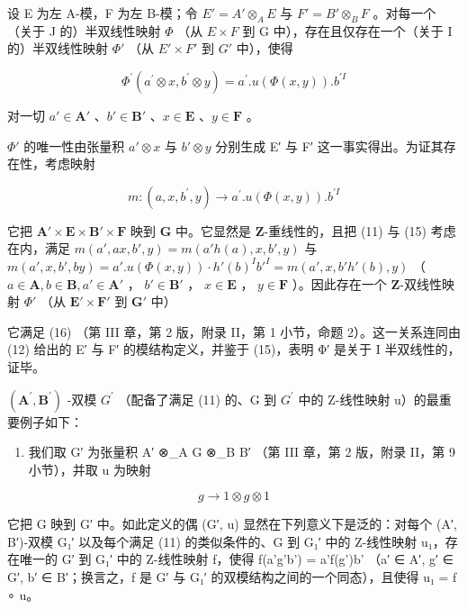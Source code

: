 设 E 为左 A-模，F 为左 B-模；令 \(E' = A' \otimes_{A} E\) 与 \(F' = B' \otimes_{B} F\) 。对每一个（关于 J 的）半双线性映射 \(\Phi\) （从 \(E \times F\) 到 G 中），存在且仅存在一个（关于 I 的）半双线性映射 \(\Phi'\) （从 \(E' \times F'\) 到 \(G'\) 中），使得

\[
\Phi^ {\prime} (a ^ {\prime} \otimes x, b ^ {\prime} \otimes y) = a ^ {\prime}. u (\Phi (x, y)). b ^ {\prime I}\tag{16}
\]

对一切 \(a' \in \mathbf{A}'\) 、\(b' \in \mathbf{B}'\) 、\(x \in \mathbf{E}\) 、\(y \in \mathbf{F}\) 。

\(\Phi'\) 的唯一性由张量积 \(a' \otimes x\) 与 \(b' \otimes y\) 分别生成 E′ 与 F′ 这一事实得出。为证其存在性，考虑映射

\[
m: (a, x, b ^ {\prime}, y) \rightarrow a ^ {\prime}. u (\Phi (x, y)). b ^ {\prime I}
\]

它把 \(\mathbf{A}' \times \mathbf{E} \times \mathbf{B}' \times \mathbf{F}\) 映到 \(\mathbf{G}\) 中。它显然是 \(\mathbf{Z}\)-重线性的，且把 (11) 与 (15) 考虑在内，满足 \(m(a', ax, b', y) = m(a'h(a), x, b', y)\) 与 \(m(a', x, b', by) = a'. u(\Phi(x, y)) \cdot h'(b)^{I} b'^{I} = m(a', x, b'h'(b), y)\) （ \(a \in \mathbf{A}, b \in \mathbf{B}, a' \in \mathbf{A}'\) ， \(b' \in \mathbf{B}'\) ， \(x \in \mathbf{E}\) ， \(y \in \mathbf{F}\) ）。因此存在一个 \(\mathbf{Z}\)-双线性映射 \(\Phi'\) （从 \(\mathbf{E}' \times \mathbf{F}'\) 到 \(\mathbf{G}'\) 中）

它满足 (16) （第 III 章，第 2 版，附录 II，第 1 小节，命题 2）。这一关系连同由 (12) 给出的 E′ 与 F′ 的模结构定义，并鉴于 (15)，表明 Φ′ 是关于 I 半双线性的，证毕。

\((\mathbf{A}^{\prime}, \mathbf{B}^{\prime})\) -双模 \(G^{\prime}\) （配备了满足 (11) 的、G 到 \(G^{\prime}\) 中的 Z-线性映射 u）的最重要例子如下：

\begin{enumerate}
\def\labelenumi{\arabic{enumi})}
\tightlist
\item
  我们取 G′ 为张量积 A′ ⊗\_A G ⊗\_B B′ （第 III 章，第 2 版，附录 II，第 9 小节），并取 u 为映射
\end{enumerate}

\[
g \to 1 \otimes g \otimes 1\tag{\(g\in G\)}
\]

它把 G 映到 G′ 中。如此定义的偶 (G′, u) 显然在下列意义下是泛的：对每个 (A′, B′)-双模 G₁′ 以及每个满足 (11) 的类似条件的、G 到 G₁′ 中的 Z-线性映射 u₁，存在唯一的 G′ 到 G₁′ 中的 Z-线性映射 f，使得 f(a'g'b') = a'f(g')b' （a′ ∈ A′, g′ ∈ G′, b′ ∈ B′；换言之，f 是 G′ 与 G₁′ 的双模结构之间的一个同态），且使得 u₁ = f ∘ u。

